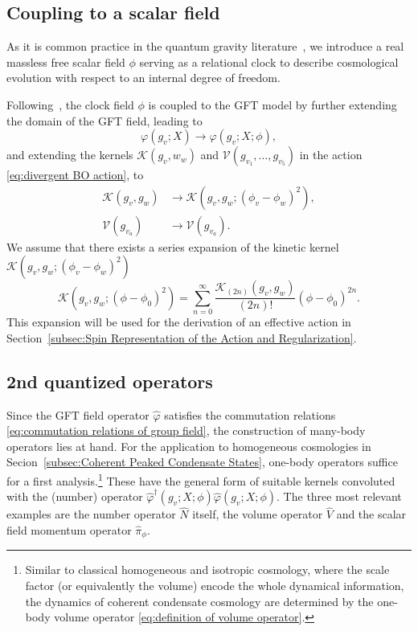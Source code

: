 \documentclass[11pt,a4paper]{article}
\begin{document}
\subsection{Coupling to a scalar field}\label{subsec:coupling to a scalar field}

As it is common practice in the quantum gravity literature~\cite{Oriti:2016qtz,Pithis:2019tvp,Marchetti:2020umh,Giesel:2012rb,Ashtekar:2011ni}, we introduce a real massless free scalar field $\phi$ serving as a relational clock to describe cosmological evolution with respect to an internal degree of freedom.

Following~\cite{Oriti:2016qtz,Li:2017uao}, the clock field $\phi$ is coupled to the GFT model by further extending the domain of the GFT field, leading to
%
\begin{equation}
\varphi(g_v;X) \longrightarrow \varphi(g_v;X;\phi),
\end{equation}
%
and extending the kernels $\mathcal{K}(g_v,w_w)$ and $\mathcal{V}(g_{v_1},...,g_{v_5})$ in the action \eqref{eq:divergent BO action}, to
%
\begin{align}
\mathcal{K}(g_v,g_w) &\longrightarrow \mathcal{K}\left(g_v,g_w;(\phi_v-\phi_w)^2\right),\label{eq:extension of kinetic kernel}\\[7pt]
\mathcal{V}(g_{v_a}) &\longrightarrow\mathcal{V}(g_{v_a}).
\end{align}
%
We assume that there exists a series expansion of the kinetic kernel $\mathcal{K}\left(g_v,g_w;(\phi_v-\phi_w)^2\right)$
%
\begin{equation}\label{eq:expansion of kinetic kernel}
\mathcal{K}\left(g_v,g_w;(\phi-\phi_0)^2\right)
=
\sum_{n=0}^{\infty}\frac{\mathcal{K}_{(2n)}(g_v,g_w)}{(2n)!}(\phi-\phi_0)^{2n} .
\end{equation}
% 
This expansion will be used for the derivation of an effective action in Section~\ref{subsec:Spin Representation of the Action and Regularization}.

\subsection{2nd quantized operators}\label{subsec:2nd Quantized Operators}

Since the GFT field operator $\hat{\varphi}$ satisfies the commutation relations \eqref{eq:commutation relations of group field}, the construction of many-body operators lies at hand. For the application to homogeneous cosmologies in Secion~\ref{subsec:Coherent Peaked Condensate States}, one-body operators suffice for a first analysis.\footnote{Similar to classical homogeneous and isotropic cosmology, where the scale factor (or equivalently the volume) encode the whole dynamical information, the dynamics of coherent condensate cosmology are determined by the one-body volume operator \eqref{eq:definition of volume operator}.}  These have the general form of suitable kernels convoluted with the (number) operator $\hat{\varphi}^{\dagger}(g_v;X;\phi)\hat{\varphi}(g_v;X;\phi)$. The three most relevant examples are the number operator $\hat{N}$ itself, the volume operator $\hat{V}$ and the scalar field momentum operator $\hat{\pi}_{\phi}$.
\end{document}
